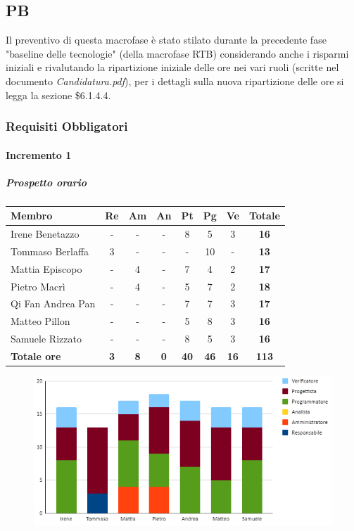 \subsection{PB}
Il preventivo di questa macrofase è stato stilato durante la precedente fase "baseline delle tecnologie" (della macrofase RTB) considerando anche i risparmi iniziali e rivalutando la ripartizione iniziale delle ore nei vari ruoli (scritte nel documento \emph{Candidatura.pdf}), per i dettagli sulla nuova ripartizione delle ore si legga la sezione \$6.1.4.4.
\subsubsection{Requisiti Obbligatori}
\paragraph{Incremento 1}
\subparagraph{Prospetto orario}
\begin{center}
	\renewcommand{\arraystretch}{1.8} %
	\begin{tabular}{ |m{10em}|c|c|c|c|c|c|c| }
	\hline
	\textbf{Membro} & \textbf{Re} & \textbf{Am} &  \textbf{An} &  \textbf{Pt} &  \textbf{Pg} &  \textbf{Ve} &  \textbf{Totale}\\
    \hline
    Irene Benetazzo   & - & - & - & 8 & 5 & 3 & \textbf{16} \\
    \hline
    Tommaso Berlaffa  & 3 & - & - & - & 10 & - & \textbf{13} \\
    \hline
    Mattia Episcopo   & - & 4 & - & 7 & 4 & 2 & \textbf{17} \\
    \hline
    Pietro Macrì      & - & 4 & - & 5 & 7 & 2 & \textbf{18} \\
    \hline
    Qi Fan Andrea Pan & - & - & - & 7 & 7 & 3 & \textbf{17} \\
    \hline
    Matteo Pillon     & - & - & - & 5 & 8 & 3 & \textbf{16} \\
    \hline
    Samuele Rizzato   & - & - & - & 8 & 5 & 3 & \textbf{16} \\
    \hline
    \textbf{Totale ore} & \textbf{3} & \textbf{8} &  \textbf{0} &  \textbf{40} &  \textbf{46} &  \textbf{16} &  \textbf{113}\\
    \hline
	\end{tabular}
\end{center}
\begin{figure}[H]
   \centering\includegraphics{images/preventivo/PB-incremento1-ore.png}
\end{figure}


